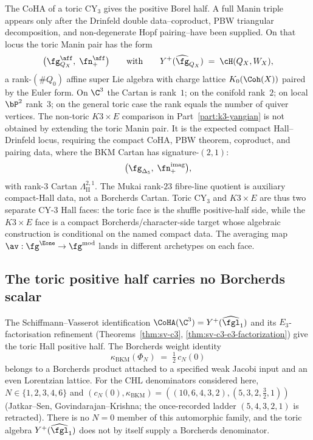 \begin{remark}
\label{rem:tcy3-coha-mcKay}
The CoHA of a toric CY$_3$ gives the positive Borel half. A full Manin
triple appears only after the Drinfeld double data--coproduct, PBW
triangular decomposition, and non-degenerate Hopf pairing--have been
supplied. On that locus the toric Manin pair has the form
\[
 \bigl( \fg_{Q_X}^{\aff},\; \fn_+^{\aff} \bigr)
 \qquad\text{with}\qquad
 Y^+(\widehat{\fg}_{Q_X}) \;=\; \cH(Q_X,W_X),
\]
a rank-$(\#Q_0)$ affine super Lie algebra with charge lattice
$K_0(\Coh(X))$ paired by the Euler form. On $\C^3$ the Cartan is
rank~$1$; on the conifold rank~$2$; on local $\bP^2$ rank~$3$; on the
general toric case the rank equals the number of quiver vertices. The
non-toric $K3 \times E$ comparison in Part~\ref{part:k3-yangian} is not
obtained by extending the toric Manin pair. It is the expected compact
Hall--Drinfeld locus, requiring the compact CoHA, PBW theorem, coproduct,
and pairing data, where the BKM Cartan has signature-$(2,1)$:
\[
 \bigl( \fg_{\Delta_5},\; \fn_+^{\mathrm{imag}} \bigr),
\]
with rank-$3$ Cartan \(\Lambda^{2,1}_{\mathrm{II}}\). The Mukai
rank-$23$ fibre-line quotient is auxiliary compact-Hall data, not a
Borcherds Cartan. Toric CY$_3$ and $K3\times E$ are thus two
separate CY-$3$ Hall faces: the toric face is the shuffle positive-half
side, while the $K3\times E$ face is a compact Borcherds/character-side
target whose algebraic construction is conditional on the named compact
data. The averaging map $\av: \fg^{\Eone} \to \fg^{\mathrm{mod}}$ lands
in different archetypes on each face.
\end{remark}

\subsection{The toric positive half carries no Borcherds scalar}
\label{subsec:bl-hodge-c3-base-case}

The Schiffmann--Vasserot identification $\CoHA(\C^3)=Y^+(\widehat{\fgl}_1)$ and its $E_3$-factorisation refinement (Theorems~\ref{thm:sv-c3}, \ref{thm:sv-c3-e3-factorization}) give the toric Hall positive half. The Borcherds weight identity
\[
 \kappa_{\mathrm{BKM}}(\Phi_N) \;=\; \tfrac{1}{2}\, c_N(0)
\]
belongs to a Borcherds product attached to a specified weak Jacobi input and an even Lorentzian lattice. For the CHL denominators considered here, $N\in\{1,2,3,4,6\}$ and $(c_N(0),\kappa_{\mathrm{BKM}})=((10,6,4,3,2),(5,3,2,\tfrac32,1))$ (Jatkar--Sen, Govindarajan--Krishna; the once-recorded ladder $(5,4,3,2,1)$ is retracted). There is no $N=0$ member of this automorphic family, and the toric algebra $Y^+(\widehat{\fgl}_1)$ does not by itself supply a Borcherds denominator.

